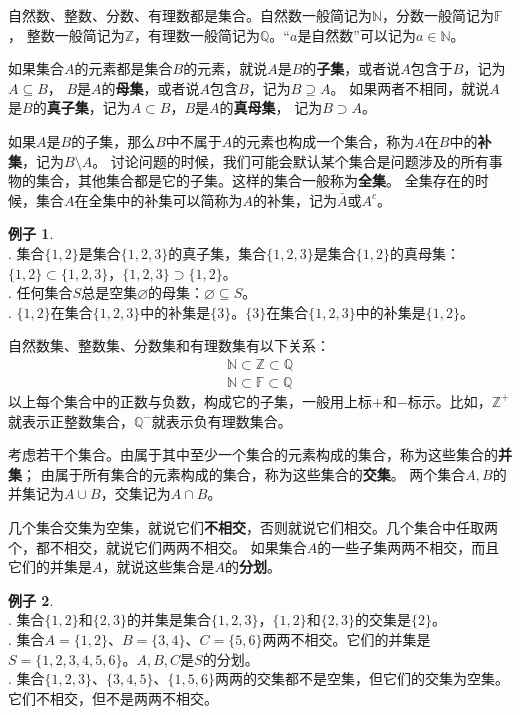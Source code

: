 \documentclass[12pt,UTF8]{ctexbook}
\theoremstyle{definition}
\newtheorem{ex}{例子}[section]
\theoremstyle{plain}
\begin{document}
自然数、整数、分数、有理数都是集合。自然数一般简记为$\mathbb{N}$，分数一般简记为$\mathbb{F}$，
整数一般简记为$\mathbb{Z}$，有理数一般简记为$\mathbb{Q}$。“$a$是自然数”可以记为$a\in\mathbb{N}$。

如果集合$A$的元素都是集合$B$的元素，就说$A$是$B$的\textbf{子集}，或者说$A$包含于$B$，记为$A\subseteq B$，
$B$是$A$的\textbf{母集}，或者说$A$包含$B$，记为$B\supseteq A$。
如果两者不相同，就说$A$是$B$的\textbf{真子集}，记为$A\subset B$，$B$是$A$的\textbf{真母集}，
记为$B\supset A$。

如果$A$是$B$的子集，那么$B$中不属于$A$的元素也构成一个集合，称为$A$在$B$中的\textbf{补集}，记为$B\setminus A$。
讨论问题的时候，我们可能会默认某个集合是问题涉及的所有事物的集合，其他集合都是它的子集。这样的集合一般称为\textbf{全集}。
全集存在的时候，集合$A$在全集中的补集可以简称为$A$的补集，记为$\bar{A}$或$A^c$。

\begin{ex}\label{ex:2-0-10}
    \mbox{} \\ 
    . 集合$\{1,2\}$是集合$\{1,2,3\}$的真子集，集合$\{1,2,3\}$是集合$\{1,2\}$的真母集：$\{1,2\}\subset \{1,2,3\}$，$\{1,2,3\}\supset \{1,2\}$。\\
    . 任何集合$S$总是空集$\varnothing$的母集：$\varnothing \subseteq S$。\\
    . $\{1,2\}$在集合$\{1,2,3\}$中的补集是$\{3\}$。$\{3\}$在集合$\{1,2,3\}$中的补集是$\{1,2\}$。
\end{ex}

自然数集、整数集、分数集和有理数集有以下关系：
\begin{align*}
    \mathbb{N}\subset\mathbb{Z}\subset\mathbb{Q}  \\
    \mathbb{N}\subset\mathbb{F}\subset\mathbb{Q} 
\end{align*}
以上每个集合中的正数与负数，构成它的子集，一般用上标$+$和$-$标示。比如，$\mathbb{Z}^+$就表示正整数集合，$\mathbb{Q}^-$就表示负有理数集合。

考虑若干个集合。由属于其中至少一个集合的元素构成的集合，称为这些集合的\textbf{并集}；
由属于所有集合的元素构成的集合，称为这些集合的\textbf{交集}。
两个集合$A, B$的并集记为$A\cup B$，交集记为$A\cap B$。

几个集合交集为空集，就说它们\textbf{不相交}，否则就说它们相交。几个集合中任取两个，都不相交，就说它们两两不相交。
如果集合$A$的一些子集两两不相交，而且它们的并集是$A$，就说这些集合是$A$的\textbf{分划}。

\begin{ex}\label{ex:2-0-20}
    \mbox{} \\ 
    . 集合$\{1,2\}$和$\{2,3\}$的并集是集合$\{1,2,3\}$，$\{1,2\}$和$\{2,3\}$的交集是$\{2\}$。\\
    . 集合$A = \{1,2\}$、$B = \{3,4\}$、$C = \{5,6\}$两两不相交。它们的并集是$S = \{1,2,3,4,5,6\}$。$A,B,C$是$S$的分划。\\
    . 集合$ \{1,2,3\}$、$\{3,4,5\}$、$\{1,5,6\}$两两的交集都不是空集，但它们的交集为空集。它们不相交，但不是两两不相交。
\end{ex}
\end{document}
